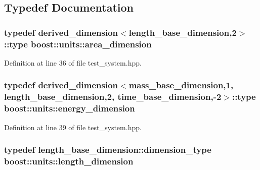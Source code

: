 \subsection{Typedef Documentation}
\subsubsection[{\texorpdfstring{area\+\_\+dimension}{area_dimension}}]{\setlength{\rightskip}{0pt plus 5cm}typedef derived\+\_\+dimension$<$length\+\_\+base\+\_\+dimension,2$>$\+::type {\bf boost\+::units\+::area\+\_\+dimension}}\hypertarget{namespaceboost_1_1units_aaa72083d461d56b8a6163423691c2c6a}{}\label{namespaceboost_1_1units_aaa72083d461d56b8a6163423691c2c6a}


Definition at line 36 of file test\+\_\+system.\+hpp.

\subsubsection[{\texorpdfstring{energy\+\_\+dimension}{energy_dimension}}]{\setlength{\rightskip}{0pt plus 5cm}typedef derived\+\_\+dimension$<$mass\+\_\+base\+\_\+dimension,1, length\+\_\+base\+\_\+dimension,2, time\+\_\+base\+\_\+dimension,-\/2$>$\+::type {\bf boost\+::units\+::energy\+\_\+dimension}}\hypertarget{namespaceboost_1_1units_a6925a7132e69383f3bcf68b27cdb9475}{}\label{namespaceboost_1_1units_a6925a7132e69383f3bcf68b27cdb9475}


Definition at line 39 of file test\+\_\+system.\+hpp.

\subsubsection[{\texorpdfstring{length\+\_\+dimension}{length_dimension}}]{\setlength{\rightskip}{0pt plus 5cm}typedef length\+\_\+base\+\_\+dimension\+::dimension\+\_\+type {\bf boost\+::units\+::length\+\_\+dimension}}\hypertarget{namespaceboost_1_1units_ae50eae7dfa312b039ce7aac232ac27c4}{}\label{namespaceboost_1_1units_ae50eae7dfa312b039ce7aac232ac27c4}



